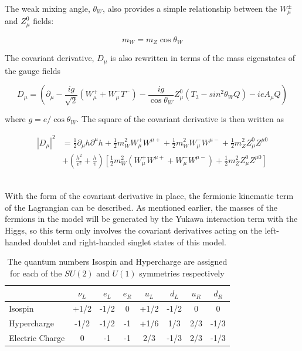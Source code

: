 \noindent The weak mixing angle, $\theta_{W}$, also provides a
simple relationship between the $W_{\mu}^{\pm}$ and $Z_{\mu}^{0}$
fields:

\begin{equation}\label{eq:ewk_mz_is_mwcosthetaW}
m_{W} = m_{Z}\cos{\theta_{W}}
\end{equation}

\noindent The covariant derivative, $D_{\mu}$ is also rewritten in
terms of the mass eigenstates of the gauge fields

\begin{equation}\label{eq:ewk_covariant_derivative_mass_eigenstates}
D_{\mu} = (\partial_{\mu} - \frac{ig}{\sqrt{2}}(W_{\mu}^{+} +
W_{\mu}^{-}T^{-}) -
\frac{ig}{\cos{\theta_{W}}}Z_{\mu}^{0}(T_{3}-sin^{2}{\theta_{W}}Q) -
ieA_{\mu}Q)
\end{equation}

\noindent where $g = e/\cos{\theta_{W}}$.  The square of the covariant
derivative is then written as

\begin{equation}\label{eq:ewk_covariant_derivative_squared_mass_eigenstates}
\begin{aligned}
|D_{\mu}|^{2} &= \frac{1}{2}\partial_{\mu}h\partial^{\mu}h +
\frac{1}{2}m_{W}^{2}W_{\mu}^{+}W^{\mu+} +
\frac{1}{2}m_{W}^{2}W_{\mu}^{-}W^{\mu-} +
\frac{1}{2}m_{Z}^{2}Z_{\mu}^{0}Z^{\mu0} \\
& + (\frac{h^{2}}{v^{2}} + \frac{h}{v})[
    \frac{1}{2}m_{W}^{2}(W_{\mu}^{+}W^{\mu+}+W_{\mu}^{-}W^{\mu-}) +
    \frac{1}{2}m_{Z}^{2}Z_{\mu}^{0}Z^{\mu0}]
\end{aligned}
\end{equation} 
\\
\par With the form of the covariant derivative in place, the
fermionic kinematic term of the Lagrangian can be described.  As
mentioned earlier, the masses of the fermions in the model will be
generated by the Yukawa interaction term with the Higgs, so this
term only involves the covariant derivatives acting on the left-handed
doublet and right-handed singlet states of this model.  

\begin{table}[h]
  \begin{center}
  \begin{tabular}{ | l | c | c | c | c | c | c | c | } \hline
    & $\nu_{L}$ & $e_{L}$ & $e_{R}$ & $u_{L}$ & $d_{L}$ & $u_{R}$ &
    $d_{R}$ \\ \hline
    Isospin & +1/2 & -1/2 & 0 & +1/2 & -1/2 & 0 & 0 \\ \hline
    Hypercharge & -1/2 & -1/2 & -1 & +1/6 & 1/3 & 2/3 & -1/3 \\ \hline
    Electric Charge & 0 & -1 & -1 & 2/3 & -1/3 & 2/3 & -1/3 \\ \hline
  \end{tabular}
  \caption{ The quantum numbers Isospin and Hypercharge are assigned for each of the $SU(2)$ and
      $U(1)$ symmetries respectively}
    \label{tab:ewk_fermion_quantum_numbers}
  \end{center}
\end{table} 

